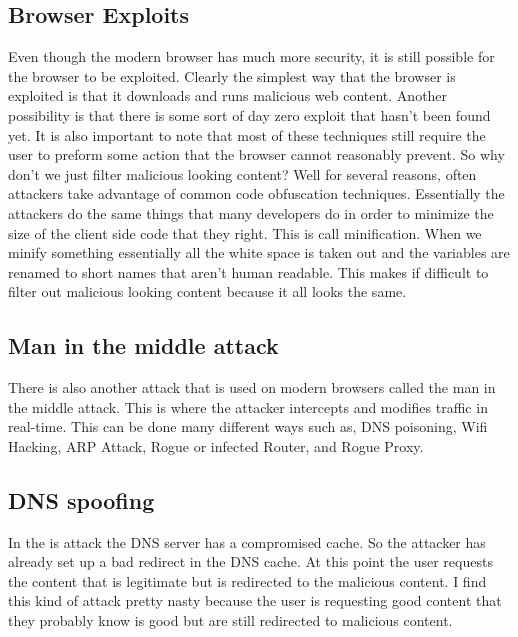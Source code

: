 \documentclass[letterpaper, onecolumn,10pt]{IEEEtran}
\begin{document}
                \subsection{Browser Exploits}
                Even though the modern browser has much more security, it is still possible for the browser to be exploited. Clearly the simplest way that the browser is exploited is that it downloads and runs malicious web content. Another possibility is that there is some sort of day zero exploit that hasn't been found yet. It is also important to note that most of these techniques still require the user to preform some action that the browser cannot reasonably prevent. So why don't we just filter malicious looking content? Well for several reasons, often attackers take advantage of common code obfuscation techniques. Essentially the attackers do the same things that many developers do in order to minimize the size of the client side code that they right. This is call minification. When we minify something essentially all the white space is taken out and the variables are renamed to short names that aren't human readable. This makes if difficult to filter out malicious looking content because it all looks the same.\\
                
                \subsection{Man in the middle attack}
                There is also another attack that is used on modern browsers called the man in the middle attack. This is where the attacker intercepts and modifies traffic in real-time. This can be done many different ways such as, DNS poisoning, Wifi Hacking, ARP Attack, Rogue or infected Router, and Rogue Proxy.\\
                
                \subsection{DNS spoofing}
                In the is attack the DNS server has a compromised cache. So the attacker has already set up a bad redirect in the DNS cache. At this point the user requests the content that is legitimate but is redirected to the malicious content. I find this kind of attack pretty nasty because the user is requesting good content that they probably know is good but are still redirected to malicious content.\\
                
\end{document}
